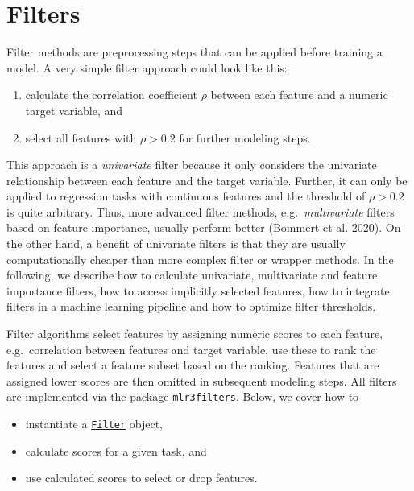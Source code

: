 \hypertarget{sec-fs-filter}{%
\section{Filters}\label{sec-fs-filter}}

Filter methods are preprocessing steps that can be
applied before training a model. A very simple filter approach could
look like this:

\begin{enumerate}
\def\labelenumi{\arabic{enumi}.}
\tightlist
\item
  calculate the correlation coefficient \(\rho\) between each feature
  and a numeric target variable, and
\item
  select all features with \(\rho > 0.2\) for further modeling steps.
\end{enumerate}

This approach is a \emph{univariate} filter because it only considers
the univariate relationship between each feature and the target
variable. Further, it can only be applied to regression tasks with
continuous features and the threshold of \(\rho > 0.2\) is quite
arbitrary. Thus, more advanced filter methods, e.g.~\emph{multivariate}
filters based on feature importance, usually perform better (Bommert et
al. 2020). On the other hand, a benefit of univariate filters is that
they are usually computationally cheaper than more complex filter or
wrapper methods. In the following, we describe how to calculate
univariate, multivariate and feature importance filters, how to access
implicitly selected features, how to integrate filters in a machine
learning pipeline and how to optimize filter thresholds.

Filter algorithms select features by assigning numeric scores to each
feature, e.g.~correlation between features and target variable, use
these to rank the features and select a feature subset based on the
ranking. Features that are assigned lower scores are then omitted in
subsequent modeling steps. All filters are implemented via the package
\href{https://mlr3filters.mlr-org.com}{\texttt{mlr3filters}}.
Below, we cover how to

\begin{itemize}
\tightlist
\item
  instantiate a
  \href{https://www.rdocumentation.org/packages/base/topics/funprog}{\texttt{Filter}}
  object,
\item
  calculate scores for a given task, and
\item
  use calculated scores to select or drop features.
\end{itemize}

